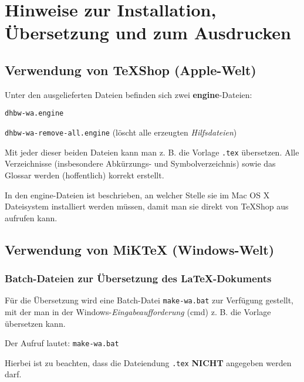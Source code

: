 \chapter{Hinweise zur Installation, \"Ubersetzung und zum Ausdrucken}


\section{Verwendung von TeXShop (Apple-Welt)}

Unter den ausgelieferten Dateien befinden sich zwei \textbf{engine}-Dateien: 

\begin{seList}
\item \verb+dhbw-wa.engine+
\item \verb+dhbw-wa-remove-all.engine+ (l\"oscht alle erzeugten \textsl{Hilfsdateien})
\end{seList}

Mit jeder dieser beiden Dateien kann man z. B. die Vorlage\newline
\hspace*{\fill}\texttt{\seVorlage.tex}\hspace*{\fill}\newline
\"ubersetzen. Alle Verzeichnisse (insbesondere Abk\"urzungs- und Symbolverzeichnis) 
sowie das Glossar werden (hoffentlich) korrekt erstellt.  

In den engine-Dateien ist beschrieben, an welcher Stelle sie im Mac OS X Dateisystem 
installiert werden m\"ussen, damit man sie direkt von TeXShop aus aufrufen kann. 

\section{Verwendung von MiKTeX (Windows-Welt)}

\subsection{Batch-Dateien zur \"Ubersetzung des \LaTeX-Dokuments}

F\"ur die \"Ubersetzung wird eine Batch-Datei \verb+make-wa.bat+ zur Verf\"ugung 
gestellt, mit der man in der Windows-\textsl{Eingabeaufforderung} (cmd) z. B. die Vorlage \"ubersetzen kann. 

Der Aufruf lautet: \texttt{make-wa.bat \seVorlage}

Hierbei ist zu beachten, dass die Dateiendung \texttt{.tex} \textbf{NICHT} angegeben werden darf.


